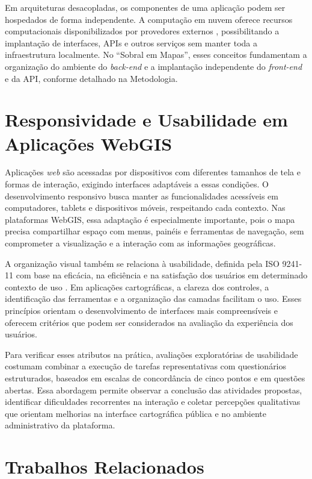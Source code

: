 Em arquiteturas desacopladas, os componentes de uma aplicação podem ser hospedados de forma independente. A computação em nuvem oferece recursos computacionais disponibilizados por provedores externos \cite{MellGrance2011}, possibilitando a implantação de interfaces, APIs e outros serviços sem manter toda a infraestrutura localmente. No ``Sobral em Mapas'', esses conceitos fundamentam a organização do ambiente do \textit{back-end} e a implantação independente do \textit{front-end} e da API, conforme detalhado na Metodologia.

\section{Responsividade e Usabilidade em Aplicações WebGIS}
\label{sec:usabilidade}

Aplicações \textit{web} são acessadas por dispositivos com diferentes tamanhos de tela e formas de interação, exigindo interfaces adaptáveis a essas condições. O desenvolvimento responsivo busca manter as funcionalidades acessíveis em computadores, tablets e dispositivos móveis, respeitando cada contexto. Nas plataformas \gls{WebGIS}, essa adaptação é especialmente importante, pois o mapa precisa compartilhar espaço com menus, painéis e ferramentas de navegação, sem comprometer a visualização e a interação com as informações geográficas.

A organização visual também se relaciona à usabilidade, definida pela ISO 9241-11 com base na eficácia, na eficiência e na satisfação dos usuários em determinado contexto de uso \cite{ISO9241112018}. Em aplicações cartográficas, a clareza dos controles, a identificação das ferramentas e a organização das camadas facilitam o uso. Esses princípios orientam o desenvolvimento de interfaces mais compreensíveis e oferecem critérios que podem ser considerados na avaliação da experiência dos usuários.

Para verificar esses atributos na prática, avaliações exploratórias de usabilidade costumam combinar a execução de tarefas representativas com questionários estruturados, baseados em escalas de concordância de cinco pontos e em questões abertas. Essa abordagem permite observar a conclusão das atividades propostas, identificar dificuldades recorrentes na interação e coletar percepções qualitativas que orientam melhorias na interface cartográfica pública e no ambiente administrativo da plataforma.

\section{Trabalhos Relacionados}
\label{sec:trabalhos-relacionados}

